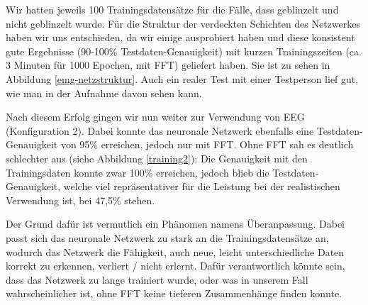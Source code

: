 \documentclass[11pt]{scrartcl}
\begin{document}
	
	Wir hatten jeweils 100 Trainingsdatensätze für die Fälle, dass geblinzelt und nicht geblinzelt wurde.
	Für die Struktur der verdeckten Schichten des Netzwerkes haben wir uns entschieden, da wir einige ausprobiert haben und diese konsistent gute Ergebnisse (90-100\% Testdaten-Genauigkeit) mit kurzen Trainingszeiten (ca. 3 Minuten für 1000 Epochen, mit FFT) geliefert haben. Sie ist zu sehen in Abbildung \ref{emg-netzstruktur}.
		Auch ein realer Test mit einer Testperson lief gut, wie man in der Aufnahme davon sehen kann. \cite{projekt-video}

	\begin{figure}[H]
	\end{figure}



	Nach diesem Erfolg gingen wir nun weiter zur Verwendung von EEG (Konfiguration 2). Dabei konnte das neuronale Netzwerk ebenfalls eine Testdaten-Genauigkeit von 95\% erreichen, jedoch nur mit FFT. Ohne FFT sah es deutlich schlechter aus (siehe Abbildung \ref{training2}): Die Genauigkeit mit den Trainingsdaten konnte zwar 100\% erreichen, jedoch blieb die Testdaten-Genauigkeit, welche viel repräsentativer für die Leistung bei der realistischen Verwendung ist, bei 47,5\% stehen.

	Der Grund dafür ist vermutlich ein Phänomen namens Überanpassung. Dabei passt sich das neuronale Netzwerk zu stark an die Trainingsdatensätze an, wodurch das Netzwerk die Fähigkeit, auch neue, leicht unterschiedliche Daten korrekt zu erkennen, verliert / nicht erlernt. Dafür verantwortlich könnte sein, dass das Netzwerk zu lange trainiert wurde, oder was in unserem Fall wahrscheinlicher ist, ohne FFT keine tieferen Zusammenhänge finden konnte.
\end{document}
